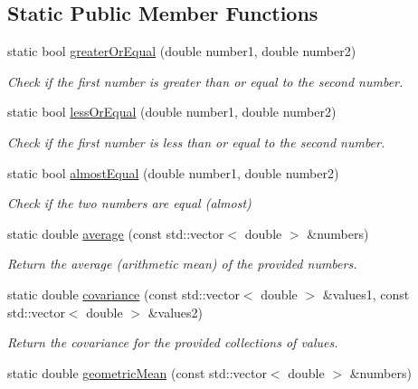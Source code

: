 \subsection*{Static Public Member Functions}
\begin{DoxyCompactItemize}
\item 
static bool \hyperlink{classmultiscale_1_1Numeric_a13ae1e2b35654937bed4c19e776ccdb5}{greater\-Or\-Equal} (double number1, double number2)
\begin{DoxyCompactList}\small\item\em Check if the first number is greater than or equal to the second number. \end{DoxyCompactList}\item 
static bool \hyperlink{classmultiscale_1_1Numeric_a7f21159a23c71c1d37e1c487e9ff815c}{less\-Or\-Equal} (double number1, double number2)
\begin{DoxyCompactList}\small\item\em Check if the first number is less than or equal to the second number. \end{DoxyCompactList}\item 
static bool \hyperlink{classmultiscale_1_1Numeric_a996dda9f7361be59b4614eace0b93f24}{almost\-Equal} (double number1, double number2)
\begin{DoxyCompactList}\small\item\em Check if the two numbers are equal (almost) \end{DoxyCompactList}\item 
static double \hyperlink{classmultiscale_1_1Numeric_a35c4c545f6ef78c31c94a85b9f070ee5}{average} (const std\-::vector$<$ double $>$ \&numbers)
\begin{DoxyCompactList}\small\item\em Return the average (arithmetic mean) of the provided numbers. \end{DoxyCompactList}\item 
static double \hyperlink{classmultiscale_1_1Numeric_a574e8c0824ad8e441898e4857816585a}{covariance} (const std\-::vector$<$ double $>$ \&values1, const std\-::vector$<$ double $>$ \&values2)
\begin{DoxyCompactList}\small\item\em Return the covariance for the provided collections of values. \end{DoxyCompactList}\item 
static double \hyperlink{classmultiscale_1_1Numeric_a53023741b672ebb4790bc2e89dbe1ee9}{geometric\-Mean} (const std\-::vector$<$ double $>$ \&numbers)

\end{DoxyCompactItemize}
